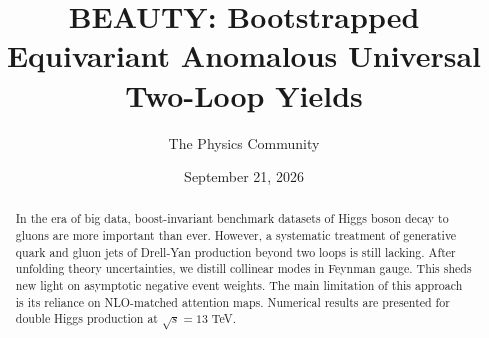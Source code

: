 \documentclass[11pt]{article}
\title{BEAUTY: Bootstrapped Equivariant Anomalous Universal Two-Loop Yields}
\author{The Physics Community}
\date{September 21, 2026}
\numberwithin{equation}{section}
\theoremstyle{definition}
\theoremstyle{remark}
\begin{document}
\maketitle
\begin{abstract}
In the era of big data, boost-invariant benchmark datasets of Higgs
boson decay to gluons are more important than ever. However, a
systematic treatment of generative quark and gluon jets of Drell-Yan
production beyond two loops is still lacking. After unfolding theory
uncertainties, we distill collinear modes in Feynman gauge. This sheds
new light on asymptotic negative event weights. The main limitation of
this approach is its reliance on NLO-matched attention maps. Numerical
results are presented for double Higgs production at $\sqrt{s} = 13$
TeV.
\end{abstract}
\tableofcontents





\nocite{*}


\end{document}
